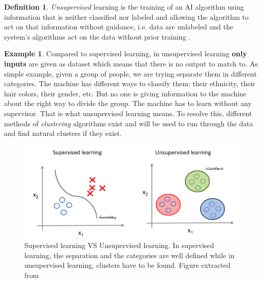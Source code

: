\documentclass[11pt, openany]{report}
\theoremstyle{plain}
\theoremstyle{definition}
\newtheorem{defn}{Definition}[section]
\newtheorem{exmp}{Example}[section]
\theoremstyle{remark}
\begin{document}
\begin{defn}
\textit{Unsupervised} learning is the training of an AI algorithm using information that is neither classified nor labeled and allowing the algorithm to act on that information without guidance, i.e. data are unlabeled and the system’s algorithms act on the data without prior training \cite{Unsupervised-1}. 
\end{defn}

\begin{exmp}
Compared to supervised learning, in unsupervised learning \textbf{only inputs} are given as dataset which means that there is no output to match to. As simple example, given a group of people, we are trying separate them in different categories. The machine has different ways to classify them: their ethnicity, their hair colors, their gender, etc. But no one is giving information to the machine about the right way to divide the group. The machine has to learn without any supervisor. That is what unsupervised learning means.   To resolve this, different methods of \textit{clustering} algorithms exist and will be used to run through the data and find natural clusters if they exist. %

\end{exmp}    

\begin{figure}[h]
  \centering
  \includegraphics[scale=0.32]{figures/supervised-unsupervised.png}
  \caption{Supervised learning VS Unsupervised learning. In supervised learning, the separation and the categories are well defined while in unsupervised learning, clusters have to be found. Figure extracted from \cite{supervisedVSunsupervised-1}}
  \label{fig:supervised-unsupervised}
\end{figure}
\end{document}
